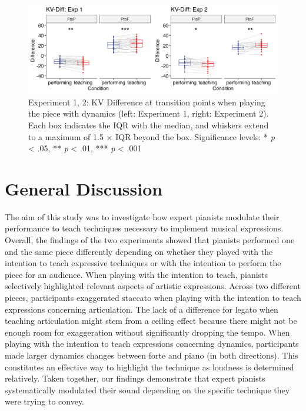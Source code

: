 \documentclass[
  man,floatsintext]{apa6}
\begin{document}
\begin{figure}
\includegraphics[width=1\linewidth]{manuscript_files/figure-latex/plot-vel-diff-1} \caption{\label{fig:vel-diff}Experiment 1, 2: KV Difference at transition points when playing the piece with dynamics (left: Experiment 1, right: Experiment 2). Each box indicates the IQR with the median, and whiskers extend to a maximum of 1.5 × IQR beyond the box. Significance levels: * \textit{p} < .05, ** \textit{p} < .01, *** \textit{p} < .001}\label{fig:plot-vel-diff}
\end{figure}

\newpage

\hypertarget{general-discussion}{%
\section{General Discussion}\label{general-discussion}}

The aim of this study was to investigate how expert pianists modulate their performance to teach techniques necessary to implement musical expressions. Overall, the findings of the two experiments showed that pianists performed one and the same piece differently depending on whether they played with the intention to teach expressive techniques or with the intention to perform the piece for an audience. When playing with the intention to teach, pianists selectively highlighted relevant aspects of artistic expressions. Across two different pieces, participants exaggerated staccato when playing with the intention to teach expressions concerning articulation. The lack of a difference for legato when teaching articulation might stem from a ceiling effect because there might not be enough room for exaggeration without significantly dropping the tempo. When playing with the intention to teach expressions concerning dynamics, participants made larger dynamics changes between forte and piano (in both directions). This constitutes an effective way to highlight the technique as loudness is determined relatively. Taken together, our findings demonstrate that expert pianists systematically modulated their sound depending on the specific technique they were trying to convey.
\end{document}
